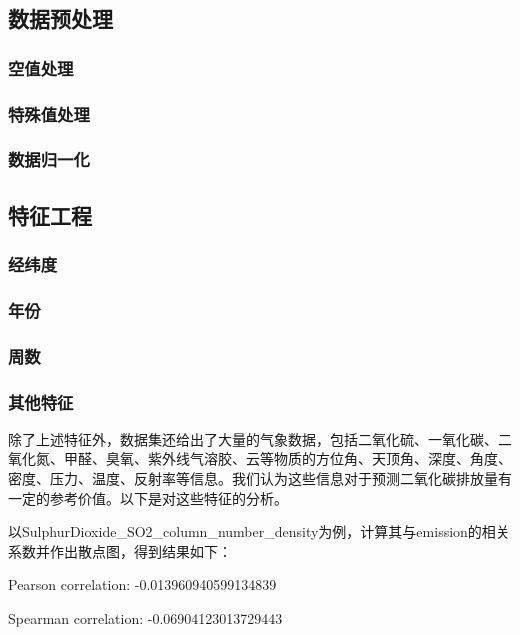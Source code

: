 \documentclass[fontset=windows]{ctexart}
\begin{document}
\subsection{数据预处理}

\subsubsection{空值处理}

\subsubsection{特殊值处理}

\subsubsection{数据归一化}

\subsection{特征工程}

\subsubsection{经纬度}

\subsubsection{年份}

\subsubsection{周数}

\subsubsection{其他特征}

除了上述特征外，数据集还给出了大量的气象数据，包括二氧化硫、一氧化碳、二氧化氮、甲醛、臭氧、紫外线气溶胶、云等物质的方位角、天顶角、深度、角度、密度、压力、温度、反射率等信息。我们认为这些信息对于预测二氧化碳排放量有一定的参考价值。以下是对这些特征的分析。

以SulphurDioxide\_SO2\_column\_number\_density为例，计算其与emission的相关系数并作出散点图，得到结果如下：

\begin{center}
Pearson correlation: -0.013960940599134839

Spearman correlation: -0.06904123013729443
\end{center}
\end{document}
